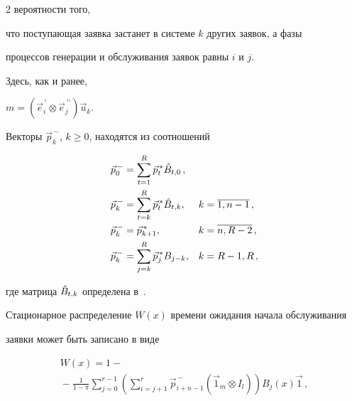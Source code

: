 \begin{multicols}{2}
вероятности того,


что поступающая заявка застанет в системе $k$ других заявок, а фазы


процессов генерации и обслуживания заявок равны $i$ и $j$.


Здесь, как и ранее,


$m=(\vec e^{\,\prime}_i\otimes \vec e^{\,\prime\prime}_j) \vec u_k$.


Векторы $\vec p_k^{\,-}$, $k\ge 0$, находятся из соотношений


\begin{align}


\label{p-_1}


\vec p_0^{\,-} & =


\sum\limits_{t=1}^{R}


\vec p_t^{\,*} \Bar B_{t,0}\,, &&\\


\vec p_k^{\,-} & =


\sum\limits_{t=k}^{R}


\vec p_t^{\,*} \Bar B_{t,k},


& k & =\overline{1,n-1}\,,\\


\vec p_k^{\,-} &=\vec p_{k+1}^{\,*}, & k & =\overline{n,R-2}\,,\\


\label{p-_4} \vec p^{\,-}_k & =


\sum\limits_{j=k}^{R} \vec p_{j}^{\,*}


B_{j-k}, & k & = R-1,R\,,


\end{align}


где матрица $\Bar B_{t,k}$ определена в~\cite{PSCh06}.





Стационарное распределение $W(x)$ времени ожидания начала обслуживания


заявки может быть записано в виде


\begin{multline}


\label{w_x}


\!\!\!W(x) =1-{}\\


\!\!{}-\frac{1}{1-\pi} \sum\limits_{j=0}^{r-1} \left( \sum\limits_{i=j+1}^{r} 


\vec p^{\,-}_{i+n-1} \left ( \vec 1_m \otimes I_l\right ) \right) B_j (x){\vec 


1}\,, \!\!



\end{multline}
\end{multicols}
